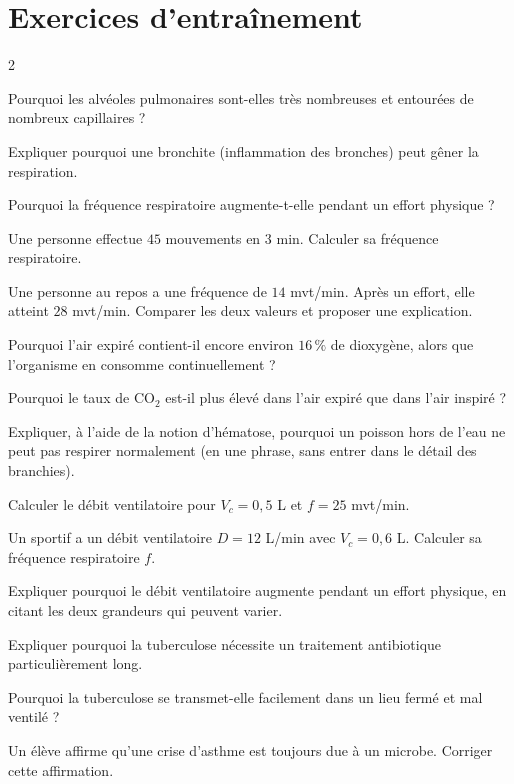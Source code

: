 \section{Exercices d'entraînement}
\begin{multicols}{2}

\exo{} Pourquoi les alvéoles pulmonaires sont-elles très nombreuses et entourées
de nombreux capillaires ?

\exo{} Expliquer pourquoi une bronchite (inflammation des bronches) peut gêner la
respiration.

\exo{} Pourquoi la fréquence respiratoire augmente-t-elle pendant un effort
physique ?

\exo{} Une personne effectue $45$ mouvements en $3$ min. Calculer sa fréquence
respiratoire.

\exo{} Une personne au repos a une fréquence de $14$ mvt/min. Après un effort,
elle atteint $28$ mvt/min. Comparer les deux valeurs et proposer une explication.

\exo{} Pourquoi l'air expiré contient-il encore environ $16\,\%$ de dioxygène,
alors que l'organisme en consomme continuellement ?

\exo{} Pourquoi le taux de $\mathrm{CO_2}$ est-il plus élevé dans l'air expiré
que dans l'air inspiré ?

\exo{} Expliquer, à l'aide de la notion d'hématose, pourquoi un poisson hors de
l'eau ne peut pas respirer normalement (en une phrase, sans entrer dans le détail des
branchies).

\exo{} Calculer le débit ventilatoire pour $V_c=0{,}5$ L et $f=25$ mvt/min.

\exo{} Un sportif a un débit ventilatoire $D=12$ L/min avec $V_c=0{,}6$ L.
Calculer sa fréquence respiratoire $f$.

\exo{} Expliquer pourquoi le débit ventilatoire augmente pendant un effort
physique, en citant les deux grandeurs qui peuvent varier.

\exo{} Expliquer pourquoi la tuberculose nécessite un traitement antibiotique
particulièrement long.

\exo{} Pourquoi la tuberculose se transmet-elle facilement dans un lieu
fermé et mal ventilé ?

\exo{} Un élève affirme qu'une crise d'asthme est toujours due à un microbe.
Corriger cette affirmation.

\end{multicols}

